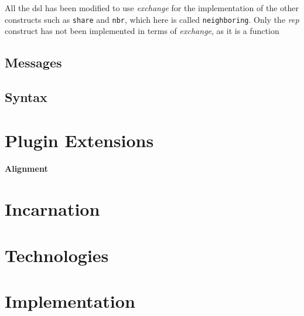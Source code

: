 All the \ac{dsl} has been modified to use \emph{exchange} for the implementation of the other constructs such as \texttt{share}
and \texttt{nbr}, which here is called \texttt{neighboring}.
Only the \emph{rep} construct has not been implemented in terms of \emph{exchange}, as it is a function

\subsection{Messages}
\label{subsec:messages}

\subsection{Syntax}
\label{subsec:syntax}

\section{Plugin Extensions}
\label{sec:plugin-extensions}

\paragraph{Alignment}

\section{Incarnation}
\label{sec:incarnation}


\section{Technologies}
\label{sec:technologies}

\section{Implementation}
\label{sec:implementation}



